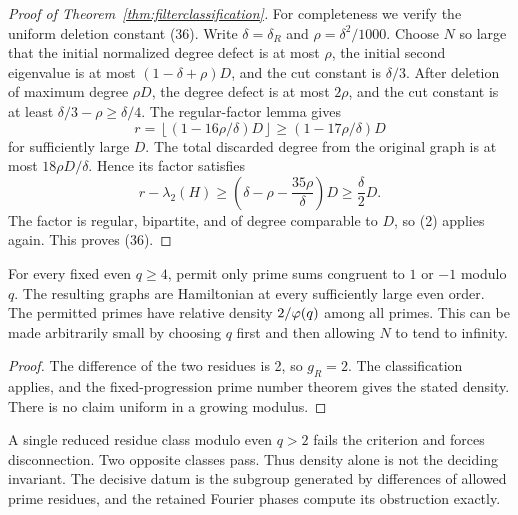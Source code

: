 \begin{proof}[Proof of Theorem~\ref{thm:filterclassification}]
For completeness we verify the uniform deletion constant (36).
Write \(\delta=\delta_R\) and \(\rho=\delta^2/1000\).
Choose \(N\) so large that the initial normalized degree defect
is at most \(\rho\), the initial second eigenvalue is at most
\((1-\delta+\rho)D\), and the cut constant is \(\delta/3\).
After deletion of maximum degree \(\rho D\), the degree defect
is at most \(2\rho\), and the cut constant is at least
\(\delta/3-\rho\geq\delta/4\).
The regular-factor lemma gives
\[
 r=\left\lfloor(1-16\rho/\delta)D\right\rfloor
                     \geq(1-17\rho/\delta)D
\]
for sufficiently large \(D\).
The total discarded degree from the original graph is at most
\(18\rho D/\delta\). Hence its factor satisfies
\[
 r-\lambda_2(H)
 \geq\left(\delta-\rho-\frac{35\rho}{\delta}\right)D
 \geq \frac{\delta}{2}D.
\]
The factor is regular, bipartite, and of degree comparable to
\(D\), so (2) applies again. This proves (36).
\end{proof}

\begin{corollary}
\label{cor:sparseprimeclasses}
For every fixed even \(q\geq4\), permit only prime sums
congruent to \(1\) or \(-1\) modulo \(q\).
The resulting graphs are Hamiltonian at every sufficiently
large even order.
The permitted primes have relative density \(2/\varphi(q)\)
among all primes. This can be made arbitrarily small by
choosing \(q\) first and then allowing \(N\) to tend to infinity.
\end{corollary}
\begin{proof}
The difference of the two residues is 2, so \(g_R=2\).
The classification applies, and the fixed-progression prime
number theorem gives the stated density.
There is no claim uniform in a growing modulus.
\end{proof}

\begin{remark}
A single reduced residue class modulo even \(q>2\) fails the
criterion and forces disconnection. Two opposite classes pass.
Thus density alone is not the deciding invariant.
The decisive datum is the subgroup generated by differences
of allowed prime residues, and the retained Fourier phases
compute its obstruction exactly.
\end{remark}

